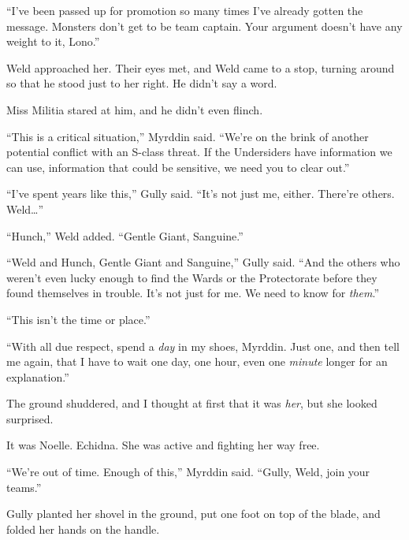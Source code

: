 ``I've been passed up for promotion so many times I've already gotten the message.  Monsters don't get to be team captain.  Your argument doesn't have any weight to it, Lono.''



Weld approached her.  Their eyes met, and Weld came to a stop, turning around so that he stood just to her right.  He didn't say a word.



Miss Militia stared at him, and he didn't even flinch.



``This is a critical situation,'' Myrddin said.  ``We're on the brink of another potential conflict with an S-class threat.  If the Undersiders have information we can use, information that could be sensitive, we need you to clear out.''



``I've spent years like this,'' Gully said.  ``It's not just me, either.  There're others.  Weld\ldots''



``Hunch,'' Weld added.  ``Gentle Giant, Sanguine.''



``Weld and Hunch, Gentle Giant and Sanguine,'' Gully said.  ``And the others who weren't even lucky enough to find the Wards or the Protectorate before they found themselves in trouble.  It's not just for me.  We need to know for \emph{them}.''



``This isn't the time or place.''



``With all due respect, spend a \emph{day} in my shoes, Myrddin.  Just one, and then tell me again, that I have to wait one day, one hour, even one \emph{minute} longer for an explanation.''



The ground shuddered, and I thought at first that it was \emph{her}, but she looked surprised.



It was Noelle.  Echidna.  She was active and fighting her way free.



``We're out of time.  Enough of this,'' Myrddin said.  ``Gully, Weld, join your teams.''



Gully planted her shovel in the ground, put one foot on top of the blade, and folded her hands on the handle.



